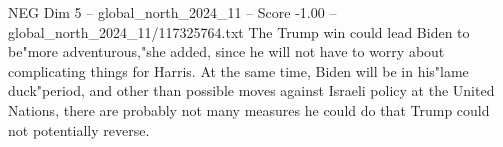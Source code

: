 \begin{textsample}{NEG Dim 5 – global\_north\_2024\_11 – Score -1.00 – global\_north\_2024\_11/117325764.txt}
The Trump win could lead Biden to be"more adventurous,"she added, since he will not have to worry about complicating things for Harris.
At the same time, Biden will be in his"lame duck"period, and other than possible moves against Israeli policy at the United Nations, there are probably not many measures he could do that Trump could not potentially reverse.

\end{textsample}

